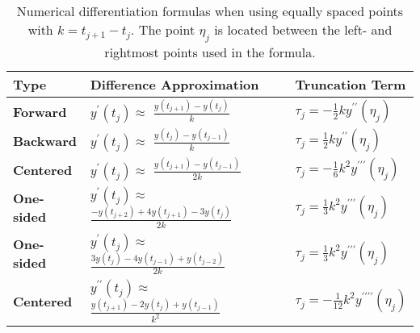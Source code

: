 \documentclass[11pt]{article}
\begin{document}
\bigskip
\begin{table}[h]
\renewcommand\arraystretch{2.5}
\renewcommand\tabcolsep{6pt}
\center
\begin{tabular}{ p{0.8in} | p{2.3in}  | p{1.4in}  } %
\textbf{Type} & \textbf{Difference Approximation} &   \textbf{Truncation Term}\\ \hline
\textbf{Forward} &  {\normalsize $y^{\prime}(t_{j}) \approx $} {\Large $\frac{y(t_{j+1})-y(t_{j})}{k}$}  &   {\normalsize $\tau_{j} = - \frac{1}{2}  k y^{\prime\prime}(\eta_{j})$} \\ %
\textbf{Backward} &  {\normalsize $y^{\prime}(t_{j}) \approx$} {\Large $\frac{y(t_{j})-y(t_{j-1})}{k}$}  &   {\normalsize $\tau_{j}=   \frac{1}{2}  k y^{\prime\prime}(\eta_{j})$}\\ %
\textbf{Centered} &  {\normalsize $y^{\prime}(t_{j}) \approx$} {\Large $\frac{y(t_{j+1})-y(t_{j-1})}{2k}$}  &   {\normalsize $\tau_{j}= - \frac{1}{6} k^{2} y^{\prime\prime\prime}(\eta_{j})$}\\ %
\textbf{One-sided} &  {\normalsize $y^{\prime}(t_{j}) \approx$} {\Large $\frac{-y(t_{j+2})+4y(t_{j+1})-3y(t_{j})}{2k}$}  &   {\normalsize $ \tau_{j}= \frac{1}{3} k^{2} y^{\prime\prime\prime}(\eta_{j})$}\\ %
\textbf{One-sided} &  {\normalsize $y^{\prime}(t_{j}) \approx$} {\Large $\frac{3y(t_{j})-4y(t_{j-1})+y(t_{j-2})}{2k}$}  &   {\normalsize $\tau_{j}=  \frac{1}{3} k^{2} y^{\prime\prime\prime}(\eta_{j})$}\\ %
\textbf{Centered} &  {\normalsize $y^{\prime\prime}(t_{j}) \approx$} 
     {\Large $ \frac{y(t_{j+1})-2y(t_{j})+y(t_{j-1})}{k^{2}}$} 
     &   {\normalsize $ \tau_{j}= - \frac{1}{12} k^{2} y^{\prime\prime\prime\prime}(\eta_{j})$}\\ %
\end{tabular}
\caption{Numerical differentiation formulas when using equally spaced points with $k=t_{j+1}-t_{j}$. The point $\eta_{j}$ is located between the left- and rightmost points used in the formula.}
\end{table}

\[
\text{ }
\]
\[
\text{ }
\]
\end{document}

